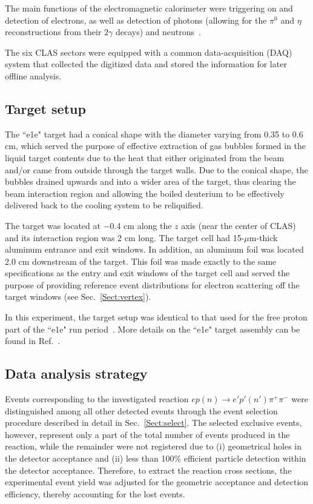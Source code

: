 \documentclass[prc,twocolumn,superscriptaddress,showpacs,amssymb,amsmath,amsfonts,aps,nofootinbib]{revtex4-1}
\begin{document}
The main functions of the electromagnetic calorimeter were triggering on and detection of electrons, as well as detection of photons (allowing for the $\pi^{0}$ and $\eta$ reconstructions from their $2\gamma$ decays) and neutrons~\cite{Amarian:2001zs}. 

The six CLAS sectors were equipped with a common data-acquisition (DAQ) system that collected the digitized data and stored the information for later offline analysis.


\subsection{Target setup}
\label{Sect:target_setup}

The ``e1e" target had a conical shape with the diameter varying from 0.35 to 0.6 cm, which served the purpose of effective extraction of gas bubbles formed in the liquid target contents due to the heat that either originated from the beam and/or came from outside through the target walls. Due to the conical shape, the bubbles drained upwards and into a wider area of the target, thus clearing the beam interaction region and allowing the boiled deuterium to be effectively delivered back to the cooling system to be reliquified. 

The target was located at $-$0.4 cm along the $z$ axis (near the center of CLAS) and its interaction region was 2 cm long. The target cell had 15-$\mu$m-thick aluminum entrance and exit windows. In addition, an aluminum foil was located 2.0 cm downstream of the target. This foil was made exactly to the same specifications as the entry and exit windows of the target cell and served the purpose of providing reference event distributions for electron scattering off the target windows (see Sec.\!~\ref{Sect:vertex}).

In this experiment, the target setup was identical to that used for the free proton part of the ``e1e" run period~\cite{Fed_an_note:2017,Fed_paper_2018}. More details on the ``e1e" target assembly can be found in Ref.\!~\cite{target}.


\subsection{Data analysis strategy}
\label{Sect:clas_software}

Events corresponding to the investigated reaction $ep(n) \rightarrow e'p'(n')\pi^{+}\pi^{-}$ were distinguished among all other detected events through the event selection procedure described in detail in Sec.\!~\ref{Sect:select}. The selected exclusive events,  however, represent only a part of the total number of events produced in the reaction, while the remainder were not registered due to (i) geometrical holes in the detector acceptance and (ii) less than 100\% efficient particle detection within the detector acceptance. Therefore, to extract the reaction cross sections, the experimental event yield was adjusted for the geometric acceptance and detection efficiency, thereby accounting for the lost events.
\end{document}
